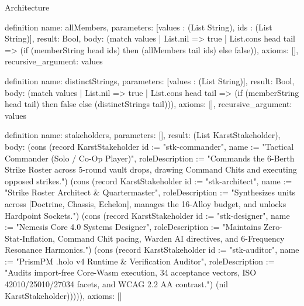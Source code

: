 \begin{lexlean}{Architecture}
\begin{semanticmodule}
definition{
  name: allMembers,
  parameters: [values : (List String), ids : (List String)],
  result: Bool,
  body: (match values
    | List.nil => true
    | List.cons head tail => (if (memberString head ids) then (allMembers tail ids) else false)),
  axioms: [],
  recursive_argument: values
}

definition{
  name: distinctStrings,
  parameters: [values : (List String)],
  result: Bool,
  body: (match values
    | List.nil => true
    | List.cons head tail => (if (memberString head tail) then false else (distinctStrings tail))),
  axioms: [],
  recursive_argument: values
}

definition{
  name: stakeholders,
  parameters: [],
  result: (List KarstStakeholder),
  body: (cons (record KarstStakeholder {id := "stk-commander", name := "Tactical Commander (Solo / Co-Op Player)", roleDescription := "Commands the 6-Berth Strike Roster across 5-round vault drops, drawing Command Chits and executing opposed strikes."}) (cons (record KarstStakeholder {id := "stk-architect", name := "Strike Roster Architect & Quartermaster", roleDescription := "Synthesizes units across [Doctrine, Chassis, Echelon], manages the 16-Alloy budget, and unlocks Hardpoint Sockets."}) (cons (record KarstStakeholder {id := "stk-designer", name := "Nemesis Core 4.0 Systems Designer", roleDescription := "Maintains Zero-Stat-Inflation, Command Chit pacing, Warden AI directives, and 6-Frequency Resonance Harmonics."}) (cons (record KarstStakeholder {id := "stk-auditor", name := "PrismPM .holo v4 Runtime & Verification Auditor", roleDescription := "Audits import-free Core-Wasm execution, 34 acceptance vectors, ISO 42010/25010/27034 facets, and WCAG 2.2 AA contrast."}) (nil KarstStakeholder))))),
  axioms: []
}


\end{semanticmodule}
\end{lexlean}
